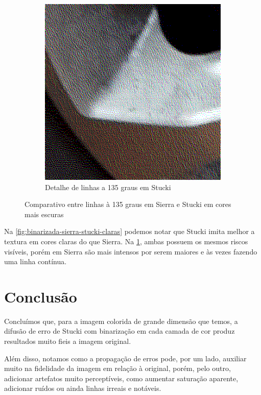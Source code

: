 \documentclass[brazilian,a4paper,twocolumn]{article}
\begin{document}
\begin{figure}
\begin{subfigure}{0.24\textwidth}
                \includegraphics[width=\textwidth,keepaspectratio]{../imgs/mel_binarizada-stucki-detalhe2.png}
                \caption{Detalhe de linhas a 135 graus em Stucki}
            \end{subfigure}

            \caption{Comparativo entre linhas à 135 graus em Sierra e Stucki em cores mais escuras}
            \label{fig:binarizada-sierra-stucki-escuras}
        \end{figure}

        Na \cref{fig:binarizada-sierra-stucki-claras} podemos notar que Stucki imita melhor a textura em cores claras do que Sierra. Na \cref{fig:binarizada-sierra-stucki-escuras}, ambas possuem os mesmos riscos visíveis, porém em Sierra são mais intensos por serem maiores e às vezes fazendo uma linha contínua.


\section{Conclusão}

    Concluímos que, para a imagem colorida de grande dimensão que temos, a difusão de erro de Stucki com binarização em cada camada de cor produz resultados muito fieis a imagem original.

    Além disso, notamos como a propagação de erros pode, por um lado, auxiliar muito na fidelidade da imagem em relação à original, porém, pelo outro, adicionar artefatos muito perceptíveis, como aumentar saturação aparente, adicionar ruídos ou ainda linhas irreais e notáveis.
\end{document}
